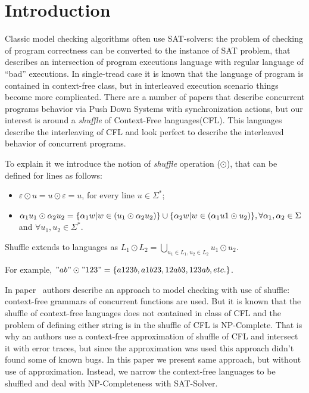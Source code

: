 \section{Introduction}
Classic model checking algorithms often use SAT-solvers: the problem of checking of program correctness can be converted to
the instance of SAT problem, that describes an intersection of program executions language with regular language of ``bad''
executions.
In single-tread case it is known that the language of program is contained in context-free class, but in interleaved execution
scenario things become more complicated. There are a number of papers that describe 
concurrent programs behavior via Push Down Systems with synchronization actions, but our interest is around a 
\textit{shuffle} of Context-Free languages(CFL). This languages describe the interleaving of CFL
and look perfect to describe the interleaved behavior of concurrent programs.

To explain it we introduce the notion of \textit{shuffle} operation ($\odot$), that can be defined for lines as follows:
\begin{itemize}
	\item $\varepsilon \odot u = u \odot \varepsilon = {u}$, for every line $ u \in \Sigma^*$;
	\item $\alpha_1 u_1 \odot \alpha_2 u_2 = \{\alpha_1 w | w \in (u_1 \odot \alpha_2 u_2) \} \cup \newline
	\{\alpha_2 w | w \in (\alpha_1 u1 \odot u_2 ) \},  \forall \alpha_1, \alpha_2 \in \Sigma$ and $\forall u_1, u_2 \in \Sigma^*$.
\end{itemize}
Shuffle extends to languages as $L_1 \odot L_2 = \bigcup\limits_{u_1\in L_1, u_2\in L_2} u_1 \odot u_2$.

For example, $"ab" \odot "123" = \{a123b,a1b23, 12ab3, 123ab, etc.\}$.

In paper~\cite{stenman2011approximating} authors describe an approach to model checking with use of shuffle: 
context-free grammars of concurrent functions are used. 
But it is known that the shuffle of context-free languages does not contained in class of CFL and the problem of
defining either string is in the shuffle of CFL is NP-Complete. That is why an authors use a context-free approximation of 
shuffle of CFL and intersect it with error traces, but since the approximation was used this approach
didn't found some of known bugs. 
In this paper we present same approach, but without use of approximation. Instead, we narrow the context-free languages
to be shuffled and deal with NP-Completeness with SAT-Solver.


